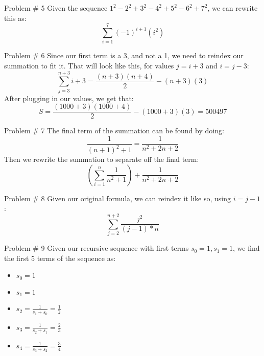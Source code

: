 \documentclass[12pt]{article}
\begin{document}
    \begin{problem}{Problem \# 5}
        Given the sequence $1^2-2^2+3^2-4^2+5^2-6^2+7^2$, we can rewrite this as:
        \[\sum_{i=1}^{7} (-1)^{i+1}(i^2)\]
    \end{problem}

    \begin{problem}{Problem \# 6}
        Since our first term is a 3, and not a 1, we need to reindex our summation to fit it. That will look like this, for values $j=i+3$ and $i=j-3$:
        \[\sum_{j=3}^{n+3}i+3 = \frac{(n+3)(n+4)}{2}-(n+3)(3)\]
        After plugging in our values, we get that:
        \[S = \frac{(1000+3)(1000+4)}{2}-(1000+3)(3) = 500497\]
    \end{problem}

    \begin{problem}{Problem \# 7}
        The final term of the summation can be found by doing:
        \[\frac{1}{(n+1)^2+1} = \frac{1}{n^2+2n+2}\]
        Then we rewrite the summation to separate off the final term:
        \[(\sum_{i=1}^n \frac{1}{n^2+1}) + \frac{1}{n^2 + 2n + 2}\]
    \end{problem}
    
    \begin{problem}{Problem \# 8}
        Given our original formula, we can reindex it like so, using $i=j-1$:
        \[\sum_{j=2}^{n+2}\frac{j^2}{(j-1)*n}\]
    \end{problem}

    \begin{problem}{Problem \# 9}
        Given our recursive sequence with first terms $s_0=1, s_1=1$, we find the first 5 terms of the sequence as:
        \begin{itemize}
            \item[] $s_0=1$
            \item[] $s_1=1$
            \item[] $s_2=\frac{1}{s_1+s_0} = \frac{1}{2}$
            \item[] $s_3 = \frac{1}{s_2+s_1} = \frac{2}{3}$
            \item[] $s_4 = \frac{1}{s_3+s_2} = \frac{3}{4}$
        \end{itemize}
    \end{problem}
\end{document}
